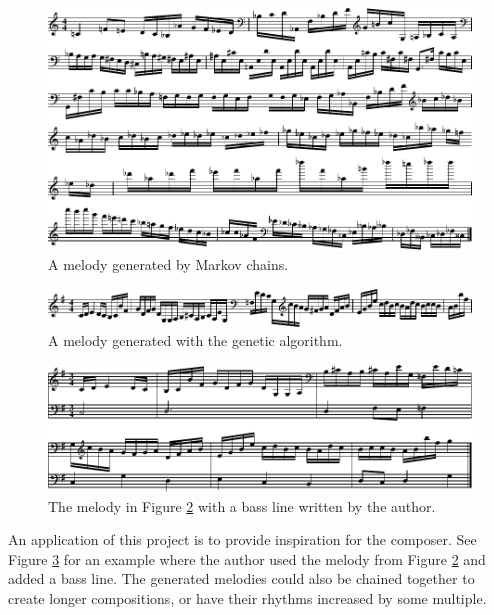 \begin{figure}[h]
	\centering
	\includegraphics[width=\linewidth]{figures/markov_melody_2.pdf}
	\caption{A melody generated by Markov chains.}
	\label{fig:music:markov2}
\end{figure}

\begin{figure}[h]
	\centering
	\includegraphics[width=\linewidth]{figures/genetic_melody_1.pdf}
	\caption{A melody generated with the genetic algorithm.}
	\label{fig:music:genetic}
\end{figure}

\begin{figure}[h]
	\centering
	\includegraphics[width=\linewidth]{figures/genetic_melody_1_harmonized.pdf}
	\caption{The melody in Figure \ref{fig:music:genetic} with a bass line written by the author.}
	\label{fig:music:geneticHarmonized}
\end{figure}

An application of this project is to provide inspiration for the composer.
See Figure \ref{fig:music:geneticHarmonized} for an example where the author used the melody from Figure \ref{fig:music:genetic} and added a bass line.
The generated melodies could also be chained together to create longer compositions, or have their rhythms increased by some multiple.

